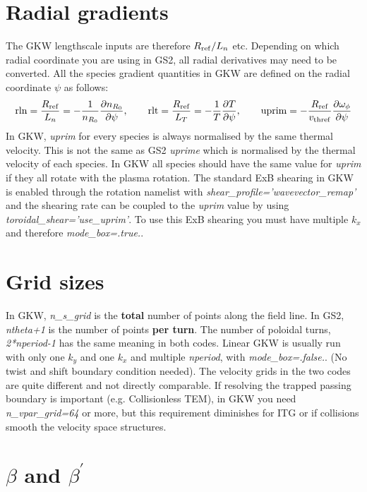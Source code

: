 \documentclass[a4paper,10pt]{article}
\newcommand{\name}[1]{\textsl{#1}} %
\begin{document}
\section{Radial gradients}

The GKW lengthscale inputs are therefore $R_{\rm ref}/ L_n$ etc.  Depending on which radial coordinate you are using in GS2, all radial derivatives may need to be converted.  All the species gradient quantities in GKW are defined on the radial coordinate $\psi$ as follows:
\label{eq:gradients}
\begin{equation}
{\rm rln} = {R_{\rm ref} \over L_n} = - {1\over n_{R_0}} {\partial n_{R_0} \over \partial \psi} ,
\qquad 
{\rm rlt} = {R_{\rm ref} \over L_T} = - {1 \over T} {\partial T \over \partial \psi} , 
\qquad 
{\rm uprim} = - {R_{\rm ref} \over v_{\rm thref}} {\partial \omega_\phi \over \partial \psi}  
\end{equation}
In GKW, \name{uprim} for every species is always normalised by the same thermal velocity.
This is not the same as GS2 \name{uprime} which is normalised by the thermal velocity of each species.  In GKW all species should have the same value for \name{uprim} if they all rotate with the plasma rotation.  The standard ExB shearing in GKW is enabled through the rotation namelist with \name{shear\_profile='wavevector\_remap'} and the shearing rate can be coupled to the \name{uprim} value by using \name{toroidal\_shear='use\_uprim'}.  To use this ExB shearing you must have multiple $k_x$ and therefore \name{mode\_box=.true.}.

\section{Grid sizes}

In GKW, \name{n\_s\_grid} is the \textbf{total} number of points along the field line.  In GS2, \name{ntheta+1} is the number of points \textbf{per turn}.  The number of poloidal turns, \name{2*nperiod-1} has the same meaning in both codes.  Linear GKW is usually run with only one $k_y$ and one $k_x$ and multiple \name{nperiod}, with \name{mode\_box=.false.}.  (No twist and shift boundary condition needed). The velocity grids in the two codes are quite different and not directly comparable.  If resolving the trapped passing boundary is important (e.g. Collisionless TEM), in GKW you need \name{n\_vpar\_grid=64} or more, but this requirement diminishes for ITG or if collisions smooth the velocity space structures.

\section{$\beta$ and $\beta^\prime$}
\end{document}
